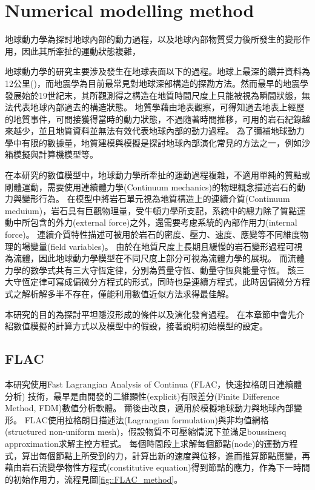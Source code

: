 
\chapter{Numerical modelling method}


地球動力學為探討地球內部的動力過程，以及地球內部物質受力後所發生的變形作用，因此其所牽扯的運動狀態複雜，


地球動力學的研究主要涉及發生在地球表面以下的過程。地球上最深的鑽井資料為12公里(\citealp{ganchin1998seismic})，而地震學為目前最常見對地球深部構造的探勘方法。然而最早的地震學發展始於19世紀末，其所觀測得之構造在地質時間尺度上只能被視為瞬間狀態，無法代表地球內部過去的構造狀態。
地質學藉由地表觀察，可得知過去地表上經歷的地質事件，可間接獲得當時的動力狀態，不過隨著時間推移，可用的岩石紀錄越來越少，並且地質資料並無法有效代表地球內部的動力過程。
為了彌補地球動力學中有限的數據量，地質建模與模擬是探討地球內部演化常見的方法之一，例如沙箱模擬與計算機模型等。


在本研究的數值模型中，地球動力學所牽扯的運動過程複雜，不適用單純的質點或剛體運動，需要使用連續體力學(Continuum mechanics)的物理概念描述岩石的動力與變形行為。
在模型中將岩石單元視為地質構造上的連續介質(Continuum meduium)，岩石具有巨觀物理量，受牛頓力學所支配，系統中的總力除了質點運動中所包含的外力(external force)之外，還需要考慮系統的內部作用力(internal force)。
連續介質特性描述可被用於岩石的密度、壓力、速度、應變等不同維度物理的場變量(field variables)。
由於在地質尺度上長期且緩慢的岩石變形過程可視為流體，因此地球動力學模型在不同尺度上部分可視為流體力學的展現。
而流體力學的數學式共有三大守恆定律，分別為質量守恆、動量守恆與能量守恆。
該三大守恆定律可寫成偏微分方程式的形式，同時也是連續方程式，此時因偏微分方程式之解析解多半不存在，僅能利用數值近似方法求得最佳解。

本研究的目的為探討平坦隱沒形成的條件以及演化發育過程。
在本章節中會先介紹數值模擬的計算方式以及模型中的假設，接著說明初始模型的設定。

\section{FLAC}

本研究使用Fast Lagrangian Analysis of Continua (FLAC，快速拉格朗日連續體分析) 技術，最早是由\citealp{cundall1989numerical}開發的二維顯性(explicit)有限差分(Finite Difference Method, FDM)數值分析軟體。
爾後由\citealp{Lavier2000}改良，適用於模擬地球動力與地球內部變形。
FLAC使用拉格朗日描述法(Lagrangian formulation)與非均值網格(structured non-uniform mesh)，假設物質不可壓縮情況下並滿足boussinesq approximation求解主控方程式。
每個時間段上求解每個節點(node)的運動方程式，算出每個節點上所受到的力，計算出新的速度與位移，進而推算節點應變，再藉由岩石流變學物性方程式(constitutive equation)得到節點的應力，作為下一時間的初始作用力，流程見圖\ref{fig::FLAC_method}。

